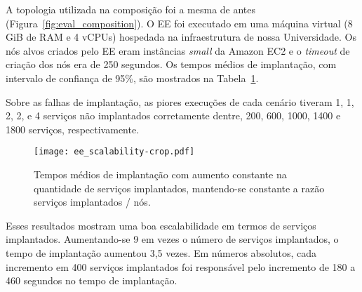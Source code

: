 A topologia utilizada na composição foi a mesma de antes (Figura~\ref{fig:eval_composition}).
O EE foi executado em uma máquina virtual (8 GiB de RAM e 4 vCPUs)
hospedada na infraestrutura de nossa Universidade.
Os nós alvos criados pelo EE eram instâncias \emph{small} da Amazon EC2 e o \emph{timeout} de criação dos nós era de 250 segundos.
Os tempos médios de implantação, com intervalo de confiança de 95\%, são mostrados na Tabela~\ref{fig:ee_scalability}.

Sobre as falhas de implantação,
as piores execuções de cada cenário tiveram 1, 1, 2, 2, e 4 serviços não implantados corretamente
dentre, 200, 600, 1000, 1400 e 1800 serviços, respectivamente.

\begin{figure}[h]
  \centering
  \texttt{[image: ee\_scalability-crop.pdf]}
  \caption{Tempos médios de implantação com aumento constante na quantidade de serviços implantados, mantendo-se constante a razão serviços implantados / nós. }
  \label{fig:ee_scalability}
\end{figure}

Esses resultados mostram uma boa escalabilidade em termos de serviços implantados.
Aumentando-se 9 em vezes o número de serviços implantados, o tempo de implantação aumentou 3,5 vezes.
Em números absolutos, cada incremento em 400 serviços implantados foi responsável pelo incremento
de 180 a 460 segundos no tempo de implantação.




